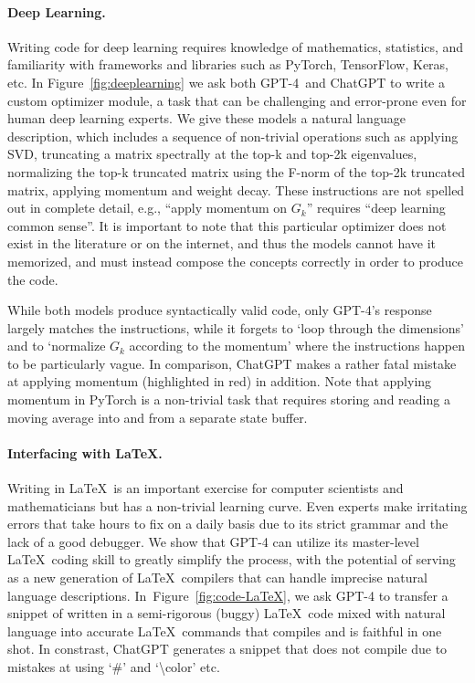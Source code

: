 \paragraph{Deep Learning.} Writing code for deep learning requires knowledge of mathematics, statistics, and familiarity with frameworks and libraries such as PyTorch, TensorFlow, Keras, etc. In Figure~\ref{fig:deeplearning} we ask both GPT-4\ and ChatGPT to write a custom optimizer module, a task that can be challenging and error-prone even for human deep learning experts. We give these models a natural language description, which includes a sequence of non-trivial operations such as applying SVD, truncating a matrix spectrally at the top-k and top-2k eigenvalues, normalizing the top-k truncated matrix using the F-norm of the top-2k truncated matrix, applying momentum and weight decay. These instructions are not spelled out in complete detail, e.g., ``apply momentum on $G_k$'' requires ``deep learning common sense''. It is important to note that this particular optimizer does not exist in the literature or on the internet, and thus the models cannot have it memorized, and must instead compose the concepts correctly in order to produce the code. 

While both models produce syntactically valid code, only GPT-4's response largely matches the instructions, while it forgets to `loop through the dimensions' and to `normalize $G_k$ according to the momentum' where the instructions happen to be particularly vague. In comparison, ChatGPT makes a rather fatal mistake at applying momentum (highlighted in red) in addition. Note that applying momentum in PyTorch is a non-trivial task that requires storing and reading a moving average into and from a separate state buffer.

\paragraph{Interfacing with \LaTeX.} Writing in \LaTeX\ is an important exercise for computer scientists and mathematicians but has a non-trivial learning curve. Even experts make irritating errors that take hours to fix on a daily basis due to its strict grammar and the lack of a good debugger. We show that {GPT-4} can utilize its master-level \LaTeX\ coding skill to greatly simplify the process, with the potential of serving as a new generation of \LaTeX\ compilers that can handle imprecise natural language descriptions. In~Figure~\ref{fig:code-LaTeX}, we ask {GPT-4} to transfer a snippet of written in a semi-rigorous (buggy) \LaTeX\ code mixed with natural language into accurate \LaTeX\ commands that compiles and is faithful in one shot. In constrast, ChatGPT generates a snippet that does not compile due to mistakes at using `\#' and `\textbackslash{color}' etc.

